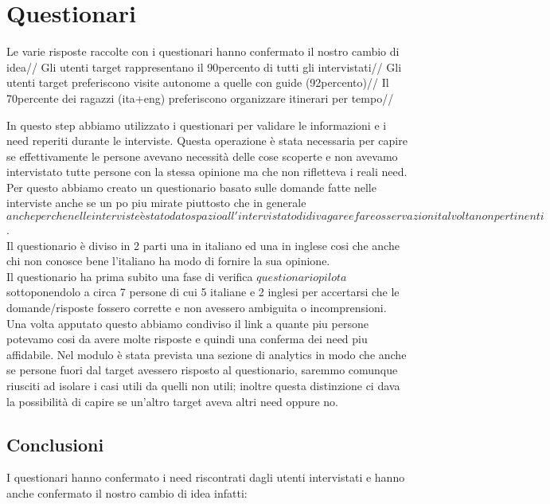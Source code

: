 \section{Questionari}

Le varie risposte raccolte con i questionari hanno confermato il nostro cambio di idea//
Gli utenti target rappresentano il 90percento di tutti gli intervistati//
Gli utenti target preferiscono visite autonome a quelle con guide (92percento)//
Il 70percente dei ragazzi (ita+eng) preferiscono organizzare itinerari per tempo//

In questo step abbiamo utilizzato i questionari per validare le informazioni e i need reperiti durante le interviste.
Questa operazione è stata necessaria per capire se effettivamente le persone avevano necessità delle cose scoperte e non avevamo intervistato tutte persone con la stessa opinione ma che non rifletteva i reali need.\\
Per questo abbiamo creato un questionario basato sulle domande fatte nelle interviste anche se un po piu mirate piuttosto che in generale \(anche perche nelle interviste è stato dato spazio all'intervistato di divagare e fare osservazioni talvolta non pertinenti\).\\
Il questionario è diviso in 2 parti una in italiano ed una in inglese cosi che anche chi non conosce bene l'italiano ha modo di fornire la sua opinione.\\
Il questionario ha prima subito una fase di verifica \(questionario pilota\) sottoponendolo a circa 7 persone di cui 5 italiane e 2 inglesi per accertarsi che le domande/risposte fossero corrette e non avessero ambiguita o incomprensioni.\\
Una volta apputato questo abbiamo condiviso il link a quante piu persone potevamo cosi da avere molte risposte e quindi una conferma dei need piu affidabile. Nel modulo è stata prevista una sezione di analytics in modo che anche se persone fuori dal target avessero risposto al questionario, saremmo comunque riusciti ad isolare i casi utili da quelli non utili; inoltre questa distinzione ci dava la possibilità di capire se un'altro target aveva altri need oppure no.\\

\subsection{Conclusioni}
I questionari hanno confermato i need riscontrati dagli utenti intervistati e hanno anche confermato il nostro cambio di idea infatti:\\

